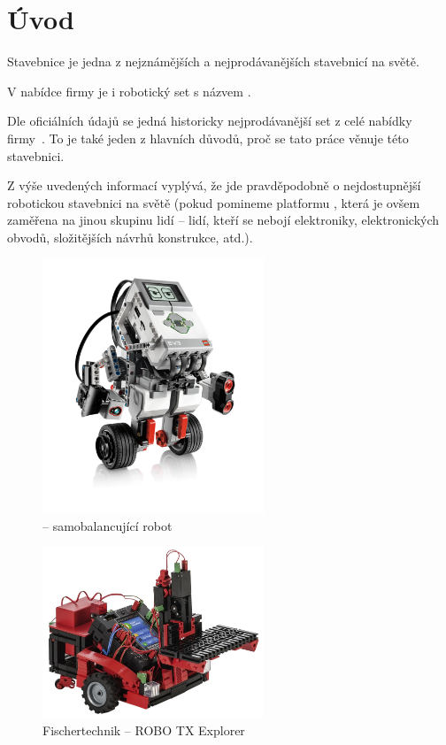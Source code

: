 \chapter{Úvod}

Stavebnice \lego{ }je jedna z nejznámějších a nejprodávanějších stavebnicí na světě. 

V nabídce firmy \lego{ }je i robotický set s názvem \legoM. 

Dle oficiálních údajů se jedná historicky nejprodávanější set z celé nabídky firmy~\cite{legoGizmodo_SalesStatistic}. 
To je také jeden z hlavních důvodů, proč se tato práce věnuje této stavebnici. 

Z výše uvedených informací vyplývá, že jde pravděpodobně o nejdostupnější robotickou stavebnici na světě (pokud pomineme platformu \arduino, která je ovšem zaměřena na jinou skupinu lidí -- lidí, kteří se nebojí elektroniky, elektronických obvodů, složitějších návrhů konstrukce, atd.).

\begin{figure}[h]
	\centering
	\includegraphics[width=250px]{images/lego-mindstorms-ev3_Robotics-for-Kids.png}
	\caption[\legoEV{ }-- samobalancující robot]{\legoEV{ }-- samobalancující robot\protect\footnotemark}
	\label{fig:lego-mindstorms-ev3_Robotics-for-Kids}
\end{figure}



\begin{figure}[h]
	\centering
	\includegraphics[width=250px]{images/fischertechnik_ROBO-TX-Explorer_02.jpg}
	\caption[Fischertechnik -- ROBO TX Explorer]{Fischertechnik -- ROBO TX Explorer\protect\footnotemark}
	\label{fig:fischertechnik_ROBO-TX-Explorer}
\end{figure}

